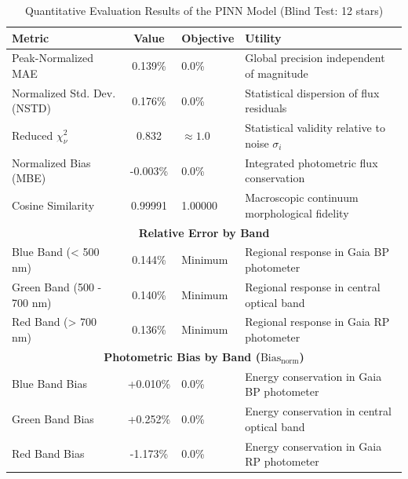 
\begin{table}[htpb]
\centering
\caption{Quantitative Evaluation Results of the PINN Model (Blind Test: 12 stars)}
\label{tab:pinn_evaluation}
\begin{tabular}{lcll}
\hline
\textbf{Metric} & \textbf{Value} & \textbf{Objective} & \textbf{Utility} \\
\hline
Peak-Normalized MAE & 0.139\% & 0.0\% & Global precision independent of magnitude \\
Normalized Std. Dev. (NSTD) & 0.176\% & 0.0\% & Statistical dispersion of flux residuals \\
Reduced $\chi^2_\nu$ & 0.832 & $\approx 1.0$ & Statistical validity relative to noise $\sigma_i$ \\
Normalized Bias (MBE) & -0.003\% & 0.0\% & Integrated photometric flux conservation \\
Cosine Similarity & 0.99991 & 1.00000 & Macroscopic continuum morphological fidelity \\
\hline
\multicolumn{4}{c}{\textbf{Relative Error by Band}} \\
\hline
Blue Band (< 500 nm) & 0.144\% & Minimum & Regional response in Gaia BP photometer \\
Green Band (500 - 700 nm) & 0.140\% & Minimum & Regional response in central optical band \\
Red Band (> 700 nm) & 0.136\% & Minimum & Regional response in Gaia RP photometer \\
\hline
\multicolumn{4}{c}{\textbf{Photometric Bias by Band ($\text{Bias}_{\text{norm}}$)}} \\
\hline
Blue Band Bias & +0.010\% & 0.0\% & Energy conservation in Gaia BP photometer \\
Green Band Bias & +0.252\% & 0.0\% & Energy conservation in central optical band \\
Red Band Bias & -1.173\% & 0.0\% & Energy conservation in Gaia RP photometer \\
\hline
\end{tabular}
\end{table}
